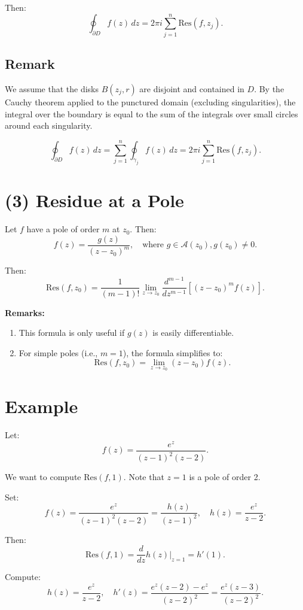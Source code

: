 \documentclass[12pt]{article}
\theoremstyle{definition} %
\theoremstyle{plain} %
\begin{document}
Then:
\[
\oint_{\partial D} f(z)\,dz = 2\pi i \sum_{j=1}^n \text{Res}(f, z_j).
\]

\subsection*{Remark}

We assume that the disks $B(z_j, r)$ are disjoint and contained in $D$. By the Cauchy theorem applied to the punctured domain (excluding singularities), the integral over the boundary is equal to the sum of the integrals over small circles around each singularity.

\[
\oint_{\partial D} f(z)\,dz = \sum_{j=1}^n \oint_{\gamma_j} f(z)\,dz = 2\pi i \sum_{j=1}^n \text{Res}(f, z_j).
\]

\section*{(3) Residue at a Pole}

Let $f$ have a pole of order $m$ at $z_0$. Then:
\[
f(z) = \frac{g(z)}{(z - z_0)^m}, \quad \text{where } g \in \mathcal{A}(z_0), g(z_0) \neq 0.
\]

Then:
\[
\text{Res}(f, z_0) = \frac{1}{(m-1)!} \lim_{z \to z_0} \frac{d^{m-1}}{dz^{m-1}} \left[ (z - z_0)^m f(z) \right].
\]

\textbf{Remarks:}
\begin{enumerate}
    \item This formula is only useful if $g(z)$ is easily differentiable.
    \item For simple poles (i.e., $m = 1$), the formula simplifies to:
    \[
    \text{Res}(f, z_0) = \lim_{z \to z_0} (z - z_0) f(z).
    \]
\end{enumerate}

\section*{Example}

Let:
\[
f(z) = \frac{e^z}{(z - 1)^2 (z - 2)}.
\]

We want to compute $\text{Res}(f, 1)$. Note that $z = 1$ is a pole of order 2.

Set:
\[
f(z) = \frac{e^z}{(z - 1)^2 (z - 2)} = \frac{h(z)}{(z - 1)^2}, \quad h(z) = \frac{e^z}{z - 2}.
\]

Then:
\[
\text{Res}(f, 1) = \frac{d}{dz} h(z) \Big|_{z=1} = h'(1).
\]

Compute:
\[
h(z) = \frac{e^z}{z - 2}, \quad h'(z) = \frac{e^z (z - 2) - e^z}{(z - 2)^2} = \frac{e^z (z - 3)}{(z - 2)^2}.
\]
\end{document}
